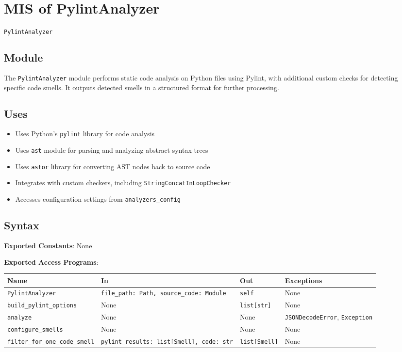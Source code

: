 \documentclass[12pt, titlepage]{article}
\begin{document}
  
\newpage
\section{MIS of PylintAnalyzer} \label{mis:PylintAnalyzer}

\texttt{PylintAnalyzer}

\subsection{Module}

The \texttt{PylintAnalyzer} module performs static code analysis on Python files using Pylint, with additional custom checks for detecting specific code smells. It outputs detected smells in a structured format for further processing.

\subsection{Uses}
\begin{itemize}
\item Uses Python's \texttt{pylint} library for code analysis
\item Uses \texttt{ast} module for parsing and analyzing abstract syntax trees
\item Uses \texttt{astor} library for converting AST nodes back to source code
\item Integrates with custom checkers, including \texttt{StringConcatInLoopChecker}
\item Accesses configuration settings from \texttt{analyzers\_config}
\end{itemize}

\subsection{Syntax}
\noindent
\textbf{Exported Constants}: None

\noindent
\textbf{Exported Access Programs}:\\
{\footnotesize
\begin{tabularx}{\linewidth}{|
    l|
    >{\raggedright\arraybackslash}X|
    l|
    l|}
  \hline
  \textbf{Name} & \textbf{In} & \textbf{Out} & \textbf{Exceptions} \\\hline
  \texttt{PylintAnalyzer} & \texttt{file\_path: Path, source\_code: Module} & \texttt{self} & None \\
  \hline
  \texttt{build\_pylint\_options} & None & \texttt{list[str]} & None \\
  \hline
  \texttt{analyze} & None & None & \texttt{JSONDecodeError}, \texttt{Exception} \\
  \hline
  \texttt{configure\_smells} & None & None & None \\
  \hline
  \texttt{filter\_for\_one\_code\_smell} & \texttt{pylint\_results: list[Smell], code: str} & \texttt{list[Smell]} & None \\
  \hline
\end{tabularx}
}
\end{document}
